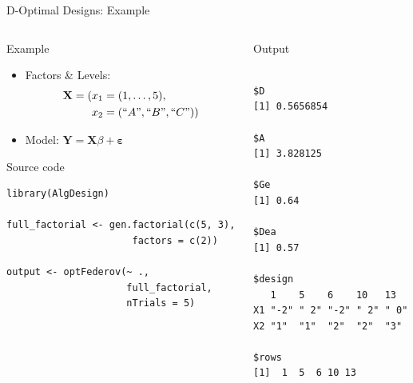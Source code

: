 \documentclass[10pt, compress, aspectratio=169, xcolor={table,usenames,dvipsnames}]{beamer}
\begin{document}
\begin{frame}[label={sec:org5cd2880},fragile]{D-Optimal Designs: Example}
 \begin{columns}
\begin{column}{0.6\columnwidth}
\begin{block}{Example}
\begin{itemize}
\item Factors \& Levels:
\begin{align*}
\mathbf{X} = (x_1 = & \; (1, \dots, 5), \\
x_2 = & \; (``A", ``B", ``C"))
\end{align*}
\item Model: \(\mathbf{Y} = \mathbf{X}\beta + \mathbf{\varepsilon}\)
\end{itemize}

\begin{block}{Source code}
\vspace{-.2cm}

\lstset{language=r,label= ,caption= ,captionpos=b,numbers=none}
\begin{lstlisting}
library(AlgDesign)

full_factorial <- gen.factorial(c(5, 3),
                      factors = c(2))

output <- optFederov(~ .,
                     full_factorial,
                     nTrials = 5)
\end{lstlisting}
\end{block}
\end{block}
\end{column}

\begin{column}{0.4\columnwidth}
\begin{block}{Output}
\vspace{-.2cm}
\scriptsize

\begin{verbatim}

$D
[1] 0.5656854

$A
[1] 3.828125

$Ge
[1] 0.64

$Dea
[1] 0.57

$design
   1    5    6    10   13
X1 "-2" " 2" "-2" " 2" " 0"
X2 "1"  "1"  "2"  "2"  "3"

$rows
[1]  1  5  6 10 13
\end{verbatim}


\normalsize
\end{block}
\end{column}
\end{columns}
\end{frame}
\end{document}
